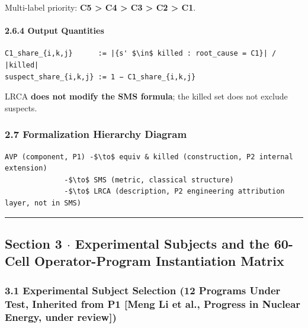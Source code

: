 \documentclass[review,12pt,authoryear]{elsarticle}
\begin{document}
Multi-label priority: \textbf{C5 \textgreater{} C4 \textgreater{} C3
\textgreater{} C2 \textgreater{} C1}.

\paragraph{2.6.4 Output Quantities}\label{output-quantities}

\begin{verbatim}
C1_share_{i,k,j}      := |{s' $\in$ killed : root_cause = C1}| / |killed|
suspect_share_{i,k,j} := 1 − C1_share_{i,k,j}
\end{verbatim}

LRCA \textbf{does not modify the SMS formula}; the killed set does not
exclude suspects.

\subsubsection{2.7 Formalization Hierarchy
Diagram}\label{formalization-hierarchy-diagram}

\begin{verbatim}
AVP (component, P1) -$\to$ equiv & killed (construction, P2 internal extension)
              -$\to$ SMS (metric, classical structure)
              -$\to$ LRCA (description, P2 engineering attribution layer, not in SMS)
\end{verbatim}

\begin{center}\rule{0.5\linewidth}{0.5pt}\end{center}

\subsection{Section 3 $\cdot$ Experimental Subjects and the 60-Cell
Operator-Program Instantiation
Matrix}\label{section-3-experimental-subjects-and-the-60-cell-operator-program-instantiation-matrix}

\subsubsection{3.1 Experimental Subject Selection (12 Programs Under
Test, Inherited from P1 {[}Meng Li et al., Progress in Nuclear Energy,
under
review{]})}\label{experimental-subject-selection-12-programs-under-test-inherited-from-p1-meng-li-et-al.-progress-in-nuclear-energy-under-review}
\end{document}

